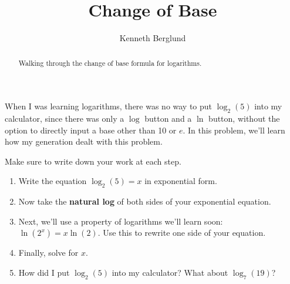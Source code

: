 \documentclass{ximera}
\title{Change of Base}
\author{Kenneth Berglund}
\begin{document}
\begin{abstract}
    Walking through the change of base formula for logarithms.
\end{abstract}
\maketitle

When I was learning logarithms, there was no way to put \(\log_2(5)\)
into my calculator, since there was only a \(\log\) button and a
\(\ln\) button, without the option to directly input a base other
than 10 or \(e\). In this problem, we'll learn how my generation
dealt with this problem. 

Make sure to write down your work at each step.

\begin{enumerate}
    \item Write the equation \(\log_2(5) = x\) in exponential form.
    \item Now take the \textbf{natural log} of both sides of your
    exponential equation.
    \item Next, we'll use a property of logarithms we'll learn soon:
    \(\ln(2^x) = x \ln(2)\). Use this to rewrite one side of your equation.
    \item Finally, solve for \(x\).
    \item How did I put \(\log_2(5)\) into my calculator? What about
    \(\log_7(19)\)?
    
\end{enumerate}
\end{document}
